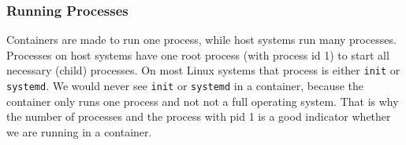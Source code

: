 \subsubsection{Running Processes}\label{subsubsection:processes}
Containers are made to run one process, while host systems run many processes. Processes on host systems have one root process (with process id 1) to start all necessary (child) processes. On most Linux systems that process is either \lstinline{init} or \lstinline{systemd}. We would never see \lstinline{init} or \lstinline{systemd} in a container, because the container only runs one process and not not a full operating system. That is why the number of processes and the process with pid 1 is a good indicator whether we are running in a container.
